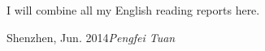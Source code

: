 %
%

\foreword

I will combine all my English reading reports here.


\vspace{\baselineskip}
\begin{flushright}\noindent
Shenzhen, Jun. 2014\hfill {\it Pengfei Tuan}\\
\end{flushright}


